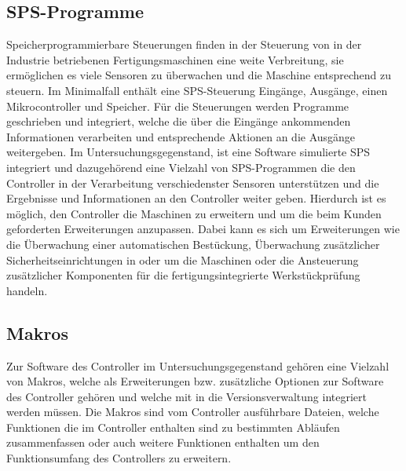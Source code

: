 
\subsection{SPS-Programme}
Speicherprogrammierbare Steuerungen finden in der Steuerung von in der Industrie betriebenen Fertigungsmaschinen eine weite Verbreitung, sie ermöglichen es viele Sensoren zu überwachen und die Maschine entsprechend zu steuern. Im Minimalfall enthält eine SPS-Steuerung Eingänge, Ausgänge, einen Mikrocontroller und Speicher. Für die Steuerungen werden Programme geschrieben und integriert, welche die über die Eingänge ankommenden Informationen verarbeiten und entsprechende Aktionen an die Ausgänge weitergeben.
Im Untersuchungsgegenstand, ist eine Software simulierte SPS integriert und dazugehörend eine Vielzahl von SPS-Programmen die den Controller in der Verarbeitung verschiedenster Sensoren unterstützen und die Ergebnisse und Informationen an den Controller weiter geben. Hierdurch ist es möglich, den Controller die Maschinen zu erweitern und um die beim Kunden geforderten Erweiterungen anzupassen. Dabei kann es sich um Erweiterungen wie die Überwachung einer automatischen Bestückung, Überwachung zusätzlicher Sicherheitseinrichtungen in oder um die Maschinen oder die Ansteuerung zusätzlicher Komponenten für die fertigungsintegrierte Werkstückprüfung handeln.





\subsection{Makros}
Zur Software des Controller im Untersuchungsgegenstand gehören eine Vielzahl von Makros, welche als Erweiterungen bzw. zusätzliche Optionen zur Software des Controller gehören und welche mit in die Versionsverwaltung integriert werden müssen. Die Makros sind vom Controller ausführbare Dateien, welche Funktionen die im Controller enthalten sind zu bestimmten Abläufen zusammenfassen oder auch weitere Funktionen enthalten um den Funktionsumfang des Controllers zu erweitern.



